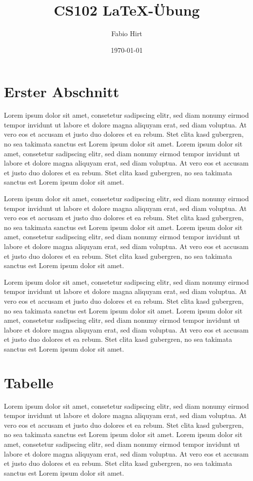 \documentclass[11pt]{article}
\date{\today}
\author{Fabio Hirt}
\title{CS102 \LaTeX -Übung}
\begin{document}
\maketitle

\section{Erster Abschnitt}
Lorem ipsum dolor sit amet, consetetur sadipscing elitr, sed diam nonumy eirmod tempor invidunt ut labore et dolore magna aliquyam erat, sed diam voluptua. At vero eos et accusam et justo duo dolores et ea rebum. Stet clita kasd gubergren, no sea takimata sanctus est Lorem ipsum dolor sit amet. Lorem ipsum dolor sit amet, consetetur sadipscing elitr, sed diam nonumy eirmod tempor invidunt ut labore et dolore magna aliquyam erat, sed diam voluptua. At vero eos et accusam et justo duo dolores et ea rebum. Stet clita kasd gubergren, no sea takimata sanctus est Lorem ipsum dolor sit amet.

Lorem ipsum dolor sit amet, consetetur sadipscing elitr, sed diam nonumy eirmod tempor invidunt ut labore et dolore magna aliquyam erat, sed diam voluptua. At vero eos et accusam et justo duo dolores et ea rebum. Stet clita kasd gubergren, no sea takimata sanctus est Lorem ipsum dolor sit amet. Lorem ipsum dolor sit amet, consetetur sadipscing elitr, sed diam nonumy eirmod tempor invidunt ut labore et dolore magna aliquyam erat, sed diam voluptua. At vero eos et accusam et justo duo dolores et ea rebum. Stet clita kasd gubergren, no sea takimata sanctus est Lorem ipsum dolor sit amet.

Lorem ipsum dolor sit amet, consetetur sadipscing elitr, sed diam nonumy eirmod tempor invidunt ut labore et dolore magna aliquyam erat, sed diam voluptua. At vero eos et accusam et justo duo dolores et ea rebum. Stet clita kasd gubergren, no sea takimata sanctus est Lorem ipsum dolor sit amet. Lorem ipsum dolor sit amet, consetetur sadipscing elitr, sed diam nonumy eirmod tempor invidunt ut labore et dolore magna aliquyam erat, sed diam voluptua. At vero eos et accusam et justo duo dolores et ea rebum. Stet clita kasd gubergren, no sea takimata sanctus est Lorem ipsum dolor sit amet.



\pagebreak
\section{Tabelle}
Lorem ipsum dolor sit amet, consetetur sadipscing elitr, sed diam nonumy eirmod tempor invidunt ut labore et dolore magna aliquyam erat, sed diam voluptua. At vero eos et accusam et justo duo dolores et ea rebum. Stet clita kasd gubergren, no sea takimata sanctus est Lorem ipsum dolor sit amet. Lorem ipsum dolor sit amet, consetetur sadipscing elitr, sed diam nonumy eirmod tempor invidunt ut labore et dolore magna aliquyam erat, sed diam voluptua. At vero eos et accusam et justo duo dolores et ea rebum. Stet clita kasd gubergren, no sea takimata sanctus est Lorem ipsum dolor sit amet.\\
\end{document}

